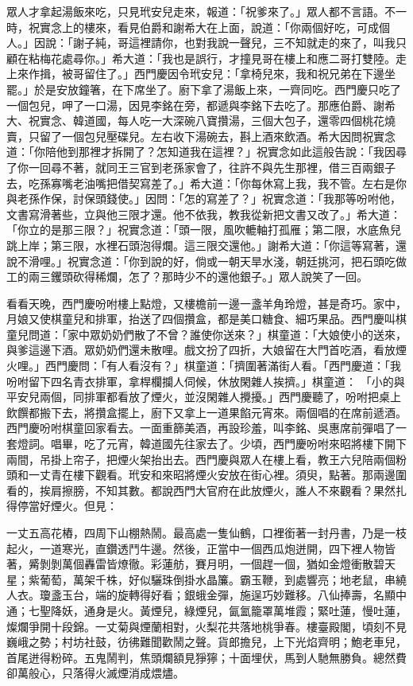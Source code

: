 眾人才拿起湯飯來吃，只見玳安兒走來，報道：「祝爹來了。」眾人都不言語。不一時，祝實念上的樓來，看見伯爵和謝希大在上面，說道：「你兩個好吃，可成個人。」因說：「謝子純，哥這裡請你，也對我說一聲兒，三不知就走的來了，叫我只顧在粘梅花處尋你。」希大道：「我也是誤行，才撞見哥在樓上和應二哥打雙陸。走上來作揖，被哥留住了。」西門慶因令玳安兒：「拿椅兒來，我和祝兄弟在下邊坐罷。」於是安放鐘箸，在下席坐了。廚下拿了湯飯上來，一齊同吃。西門慶只吃了一個包兒，呷了一口湯，因見李銘在旁，都遞與李銘下去吃了。那應伯爵、謝希大、祝實念、韓道國，每人吃一大深碗八寶攢湯，三個大包子，還零四個桃花燒賣，只留了一個包兒壓碟兒。左右收下湯碗去，斟上酒來飲酒。希大因問祝實念道：「你陪他到那裡才拆開了？怎知道我在這裡？」祝實念如此這般告說：「我因尋了你一回尋不著，就同王三官到老孫家會了，往許不與先生那裡，借三百兩銀子去，吃孫寡嘴老油嘴把借契寫差了。」希大道：「你每休寫上我，我不管。左右是你與老孫作保，討保頭錢使。」因問：「怎的寫差了？」祝實念道：「我那等吩咐他，文書寫滑著些，立與他三限才還。他不依我，教我從新把文書又改了。」希大道：「你立的是那三限？」祝實念道：「頭一限，風吹轆軸打孤雁；第二限，水底魚兒跳上岸；第三限，水裡石頭泡得爛。這三限交還他。」謝希大道：「你這等寫著，還說不滑哩。」祝實念道：「你到說的好，倘或一朝天旱水淺，朝廷挑河，把石頭吃做工的兩三钁頭砍得稀爛，怎了？那時少不的還他銀子。」眾人說笑了一回。

看看天晚，西門慶吩咐樓上點燈，又樓檐前一邊一盞羊角玲燈，甚是奇巧。家中，月娘又使棋童兒和排軍，抬送了四個攢盒，都是美口糖食、細巧果品。西門慶叫棋童兒問道：「家中眾奶奶們散了不曾？誰使你送來？」棋童道：「大娘使小的送來，與爹這邊下酒。眾奶奶們還未散哩。戲文扮了四折，大娘留在大門首吃酒，看放煙火哩。」西門慶問：「有人看沒有？」棋童道：「擠圍著滿街人看。「西門慶道：「我吩咐留下四名青衣排軍，拿桿欄攔人伺候，休放閑雜人挨擠。」棋童道： 「小的與平安兒兩個，同排軍都看放了煙火，並沒閑雜人攪擾。」西門慶聽了，吩咐把桌上飲饌都搬下去，將攢盒擺上，廚下又拿上一道果餡元宵來。兩個唱的在席前遞酒。西門慶吩咐棋童回家看去。一面重篩美酒，再設珍羞，叫李銘、吳惠席前彈唱了一套燈詞。唱畢，吃了元宵，韓道國先往家去了。少頃，西門慶吩咐來昭將樓下開下兩間，吊掛上帘子，把煙火架抬出去。西門慶與眾人在樓上看，教王六兒陪兩個粉頭和一丈青在樓下觀看。玳安和來昭將煙火安放在街心裡。須臾，點著。那兩邊圍看的，挨肩擦膀，不知其數。都說西門大官府在此放煙火，誰人不來觀看？果然扎得停當好煙火。但見：

一丈五高花樁，四周下山棚熱鬧。最高處一隻仙鶴，口裡銜著一封丹書，乃是一枝起火，一道寒光，直鑽透鬥牛邊。然後，正當中一個西瓜炮迸開，四下裡人物皆著，觱剝剝萬個轟雷皆燎徹。彩蓮舫，賽月明，一個趕一個，猶如金燈衝散碧天星；紫葡萄，萬架千株，好似驪珠倒掛水晶簾。霸玉鞭，到處響亮；地老鼠，串繞人衣。瓊盞玉台，端的旋轉得好看；銀蛾金彈，施逞巧妙難移。八仙捧壽，名顯中通；七聖降妖，通身是火。黃煙兒，綠煙兒，氤氳籠罩萬堆霞；緊吐蓮，慢吐蓮，燦爛爭開十段錦。一丈菊與煙蘭相對，火梨花共落地桃爭春。樓臺殿閣，頃刻不見巍峨之勢；村坊社鼓，彷彿難聞歡鬧之聲。貨郎擔兒，上下光焰齊明；鮑老車兒，首尾迸得粉碎。五鬼鬧判，焦頭爛額見猙獰；十面埋伏，馬到人馳無勝負。總然費卻萬般心，只落得火滅煙消成煨燼。

